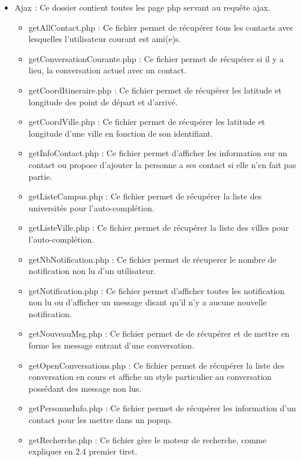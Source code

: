 \documentclass[a4paper,10pt]{report}
\begin{document}
\begin{itemize}
    \item Ajax : Ce dossier contient toutes les page php servant au requ\^ete ajax.
    \begin{itemize}
         \item getAllContact.php : Ce fichier permet de r\'ecup\'erer tous les contacts avec lesquelles l'utilisateur courant est ami(e)s.
         \item getConversationCourante.php : Ce fichier permet de r\'ecup\'erer si il y a lieu, la conversation actuel avec un contact.
         \item getCoordItineraire.php : Ce fichier permet de r\'ecup\'erer les latitude et longitude des point de d\'epart et d'arriv\'e.
         \item getCoordVille.php : Ce fichier permet de r\'ecup\'erer les latitude et longitude d'une ville en fonction de son identifiant.
         \item getInfoContact.php : Ce fichier permet d'afficher les information sur un contact ou propose d'ajouter la personne a ses contact
         si elle n'en fait pas partie.
         \item getListeCampus.php : Ce fichier permet de r\'ecup\'erer la liste des universit\'es pour l'auto-compl\'etion.
         \item getListeVille.php : Ce fichier permet de r\'ecup\'erer la liste des villes pour l'auto-compl\'etion.
         \item getNbNotification.php : Ce fichier permet de r\'ecuperer le nombre de notification non lu d'un utilisateur.
         \item getNotification.php : Ce fichier permet d'afficher toutes les notification non lu ou d'afficher un message disant qu'il n'y a
         aucune nouvelle notification.
         \item getNouveauMsg.php : Ce fichier permet de de r\'ecup\'erer et de mettre en forme les message entrant d'une conversation.
         \item getOpenConversations.php : Ce fichier permet de r\'ecup\'erer la liste des conversation en cours et affiche un style particulier au
         conversation poss\'edant des message non lus.
         \item getPersonneInfo.php : Ce fichier permet de r\'ecup\'erer les information d'un contact pour les mettre dans un popup.
         \item getRecherche.php : Ce fichier g\`ere le moteur de recherche, comme expliquer en 2.4 premier tiret.

\end{itemize}
\end{itemize}
\end{document}
